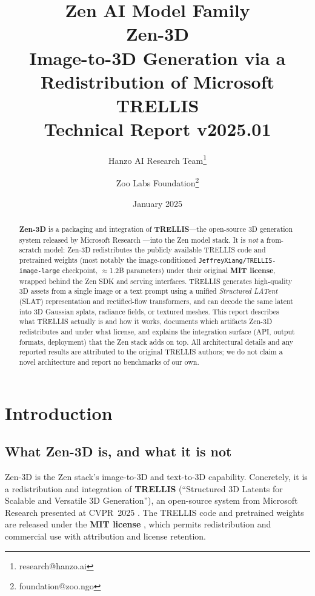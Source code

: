 \documentclass[11pt,a4paper]{article}
\title{
    \vspace{-2cm}
    \Large \textbf{Zen AI Model Family} \\
    \vspace{0.5cm}
    \Huge \textbf{Zen-3D} \\
    \vspace{0.3cm}
    \large Image-to-3D Generation via a Redistribution of Microsoft TRELLIS \\
    \vspace{0.5cm}
    \normalsize Technical Report v2025.01
}
\author{
    Hanzo AI Research Team\thanks{research@hanzo.ai} \and
    Zoo Labs Foundation\thanks{foundation@zoo.ngo}
}
\date{January 2025}
\begin{document}
\maketitle

\begin{abstract}
\textbf{Zen-3D} is a packaging and integration of \textbf{TRELLIS}---the open-source 3D
generation system released by Microsoft Research \cite{xiang2024trellis}---into the Zen model
stack. It is \emph{not} a from-scratch model: Zen-3D redistributes the publicly available
TRELLIS code and pretrained weights (most notably the image-conditioned
\texttt{JeffreyXiang/TRELLIS-image-large} checkpoint, $\approx$1.2B parameters) under their
original \textbf{MIT license}, wrapped behind the Zen SDK and serving interfaces. TRELLIS
generates high-quality 3D assets from a single image or a text prompt using a unified
\emph{Structured LATent} (SLAT) representation and rectified-flow transformers, and can decode
the same latent into 3D Gaussian splats, radiance fields, or textured meshes. This report
describes what TRELLIS actually is and how it works, documents which artifacts Zen-3D
redistributes and under what license, and explains the integration surface (API, output
formats, deployment) that the Zen stack adds on top. All architectural details and any reported
results are attributed to the original TRELLIS authors; we do not claim a novel architecture and
report no benchmarks of our own.
\end{abstract}

\tableofcontents
\newpage

\section{Introduction}

\subsection{What Zen-3D is, and what it is not}

Zen-3D is the Zen stack's image-to-3D and text-to-3D capability. Concretely, it is a
redistribution and integration of \textbf{TRELLIS} (``Structured 3D Latents for Scalable and
Versatile 3D Generation''), an open-source system from Microsoft Research presented at
CVPR~2025 \cite{xiang2024trellis}. The TRELLIS code and pretrained weights are released under
the \textbf{MIT license} \cite{trellis_repo}, which permits redistribution and commercial use
with attribution and license retention.
\end{document}
